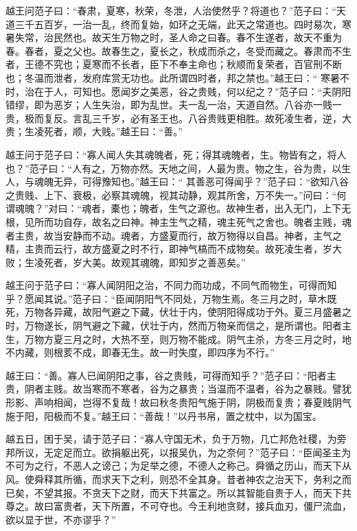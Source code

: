 \documentclass[12pt,UTF8]{ctexbook}
\begin{document}
越王问范子曰：“春肃，夏寒，秋荣，冬泄，人治使然乎？将道也？”范子曰：“天道三千五百岁，一治一乱，终而复始，如环之无端，此天之常道也。四时易次，寒暑失常，治民然也。故天生万物之时，圣人命之曰春。春不生遂者，故天不重为春。春者，夏之父也。故春生之，夏长之，秋成而杀之，冬受而藏之。春肃而不生者，王德不究也；夏寒而不长者，臣下不奉主命也；秋顺而复荣者，百官刑不断也；冬温而泄者，发府库赏无功也。此所谓四时者，邦之禁也。”越王曰：“ 寒暑不时，治在于人，可知也。愿闻岁之美恶，谷之贵贱，何以纪之？”范子曰：“夫阴阳错缪，即为恶岁；人生失治，即为乱世。夫一乱一治，天道自然。八谷亦一贱一贵，极而复反。言乱三千岁，必有圣王也。八谷贵贱更相胜。故死凌生者，逆，大贵；生凌死者，顺，大贱。”越王曰：“善。”

越王问于范子曰：“寡人闻人失其魂魄者，死；得其魂魄者，生。物皆有之，将人也？”范子曰：“人有之，万物亦然。天地之间，人最为贵。物之生，谷为贵，以生人，与魂魄无异，可得豫知也。”越王曰：“ 其善恶可得闻乎？”范子曰：“欲知八谷之贵贱、上下、衰极，必察其魂魄，视其动静，观其所舍，万不失一。”问曰：“何谓魂魄？”对曰：“魂者，橐也；魄者，生气之源也。故神生者，出入无门，上下无根，见所而功自存，故名之曰神。神主生气之精，魂主死气之舍也。魄者主贱，魂者主贵，故当安静而不动。魂者，方盛夏而行，故万物得以自昌。神者，主气之精，主贵而云行，故方盛夏之时不行，即神气槁而不成物矣。故死凌生者，岁大败；生凌死者，岁大美。故观其魂魄，即知岁之善恶矣。”

越王问于范子曰：“寡人闻阴阳之治，不同力而功成，不同气而物生，可得而知乎？愿闻其说。”范子曰：“臣闻阴阳气不同处，万物生焉。冬三月之时，草木既死，万物各异藏，故阳气避之下藏，伏壮于内，使阴阳得成功于外。夏三月盛暑之时，万物遂长，阴气避之下藏，伏壮于内，然而万物亲而信之，是所谓也。阳者主生，万物方夏三月之时，大热不至，则万物不能成。阴气主杀，方冬三月之时，地不内藏，则根荄不成，即春无生。故一时失度，即四序为不行。”

越王曰：“善。寡人已闻阴阳之事，谷之贵贱，可得而知乎？”范子曰：“阳者主贵，阴者主贱。故当寒而不寒者，谷为之暴贵；当温而不温者，谷为之暴贱。譬犹形影、声响相闻，岂得不复哉！故曰秋冬贵阳气施于阴，阴极而复贵；春夏贱阴气施于阳，阳极而不复。”越王曰：“善哉！”以丹书帛，置之枕中，以为国宝。

越五日，困于吴，请于范子曰：“寡人守国无术，负于万物，几亡邦危社稷，为旁邦所议，无定足而立。欲捐躯出死，以报吴仇，为之奈何？”范子曰：“臣闻圣主为不可为之行，不恶人之谤己；为足举之德，不德人之称己。舜循之历山，而天下从风。使舜释其所循，而求天下之利，则恐不全其身。昔者神农之治天下，务利之而已矣，不望其报。不贪天下之财，而天下共富之。所以其智能自贵于人，而天下共尊之。故曰富贵者，天下所置，不可夺也。今王利地贪财，接兵血刃，僵尸流血，欲以显于世，不亦谬乎？”
\end{document}
